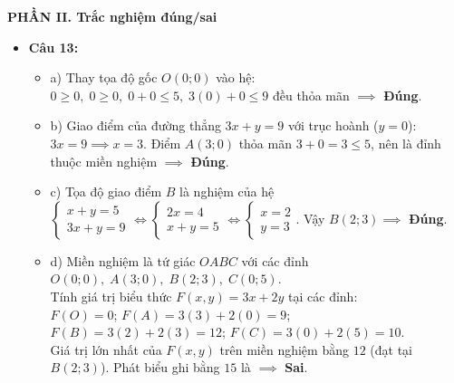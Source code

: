 \documentclass[12pt,a4paper]{article}
\begin{document}
\vspace{0.15cm}
\textbf{PHẦN II. Trắc nghiệm đúng/sai}
\begin{itemize}[leftmargin=0.6cm, itemsep=1.5pt, topsep=1pt]
    \item \textbf{Câu 13:}
    \begin{itemize}[itemsep=1pt]
        \item a) Thay tọa độ gốc $O(0; 0)$ vào hệ: $0 \ge 0,\; 0 \ge 0,\; 0 + 0 \le 5,\; 3(0) + 0 \le 9$ đều thỏa mãn $\implies$ \textbf{Đúng}.
        \item b) Giao điểm của đường thẳng $3x + y = 9$ với trục hoành ($y = 0$): $3x = 9 \implies x = 3$. Điểm $A(3; 0)$ thỏa mãn $3 + 0 = 3 \le 5$, nên là đỉnh thuộc miền nghiệm $\implies$ \textbf{Đúng}.
        \item c) Tọa độ giao điểm $B$ là nghiệm của hệ $\begin{cases} x + y = 5 \\ 3x + y = 9 \end{cases} \iff \begin{cases} 2x = 4 \\ x + y = 5 \end{cases} \iff \begin{cases} x = 2 \\ y = 3 \end{cases}$. Vậy $B(2; 3) \implies$ \textbf{Đúng}.
        \item d) Miền nghiệm là tứ giác $OABC$ với các đỉnh $O(0; 0),\; A(3; 0),\; B(2; 3),\; C(0; 5)$.\\
        Tính giá trị biểu thức $F(x, y) = 3x + 2y$ tại các đỉnh:\\
        $F(O) = 0$; $F(A) = 3(3) + 2(0) = 9$; $F(B) = 3(2) + 2(3) = 12$; $F(C) = 3(0) + 2(5) = 10$.\\
        Giá trị lớn nhất của $F(x, y)$ trên miền nghiệm bằng $12$ (đạt tại $B(2; 3)$). Phát biểu ghi bằng $15$ là $\implies$ \textbf{Sai}.
    \end{itemize}


\end{itemize}
\end{document}
